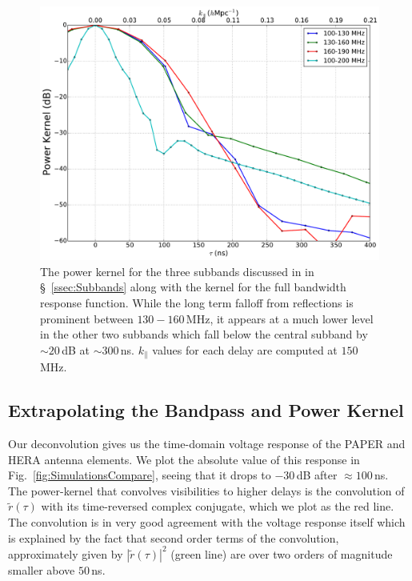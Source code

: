 \documentclass[twocolumn]{emulateapj}
\begin{document}
\begin{figure}[h!]
\includegraphics[width=.5\textwidth]{figures/powerKernelSubbands.pdf}
\caption{The power kernel for the three subbands discussed in in \S~\ref{ssec:Subbands} along with the kernel for the full bandwidth response function. While the long term falloff from reflections is prominent between $130-160$\,MHz, it appears at a much lower level in the other two subbands which fall below the central subband by $\sim 20$\,dB at $\sim 300$\,ns. $k_\parallel$ values for each delay are computed at $150$\,MHz.}
\label{fig:KernelsSubbands}
\end{figure}

\subsection{Extrapolating the Bandpass and Power Kernel}
Our deconvolution gives us the time-domain voltage response of the PAPER and HERA antenna elements. We plot the absolute value of this response in Fig.~\ref{fig:SimulationsCompare}, seeing that it drops to $-30$\,dB after $\approx 100$\,ns. The power-kernel that convolves visibilities to higher delays is the convolution of $\widetilde{r}(\tau)$ with its time-reversed complex conjugate, which we plot as the red line. The convolution is in very good agreement with the voltage response itself which is explained by the fact that second order terms of the convolution, approximately given by $|\widetilde{r}(\tau)|^2$ (green line) are over two orders of magnitude smaller above $50$\,ns.
\end{document}
